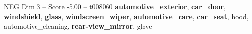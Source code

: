 \begin{textsample}{NEG Dim 3 – Score -5.00 – t008060}  \label{ex:f3_neg_028}
\textbf{automotive\_exterior}, \textbf{car\_door}, \textbf{windshield}, \textbf{glass}, \textbf{windscreen\_wiper}, \textbf{automotive\_care}, \textbf{car\_seat}, hood, automotive\_cleaning, \textbf{rear-view\_mirror}, glove

\end{textsample}
